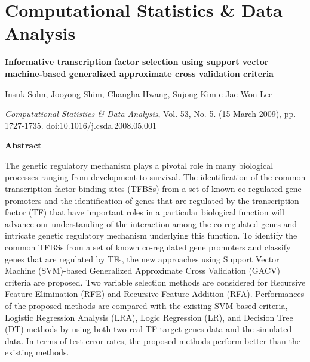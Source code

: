 \chapter{Computational Statistics \& Data Analysis}

{\Large \bf Informative transcription factor selection using support vector machine-based generalized approximate cross validation criteria}

Insuk Sohn, Jooyong Shim, Changha Hwang, Sujong Kim e Jae Won Lee

{\it Computational Statistics \& Data Analysis}, Vol. 53, No. 5. (15 March 2009), pp. 1727-1735. doi:10.1016/j.csda.2008.05.001

{\large \bf Abstract}

The genetic regulatory mechanism plays a pivotal role in many biological processes ranging from development to survival. The identification of the common transcription factor binding sites (TFBSs) from a set of known co-regulated gene promoters and the identification of genes that are regulated by the transcription factor (TF) that have important roles in a particular biological function will advance our understanding of the interaction among the co-regulated genes and intricate genetic regulatory mechanism underlying this function. To identify the common TFBSs from a set of known co-regulated gene promoters and classify genes that are regulated by TFs, the new approaches using Support Vector Machine (SVM)-based Generalized Approximate Cross Validation (GACV) criteria are proposed. Two variable selection methods are considered for Recursive Feature Elimination (RFE) and Recursive Feature Addition (RFA). Performances of the proposed methods are compared with the existing SVM-based criteria, Logistic Regression Analysis (LRA), Logic Regression (LR), and Decision Tree (DT) methods by using both two real TF target genes data and the simulated data. In terms of test error rates, the proposed methods perform better than the existing methods.